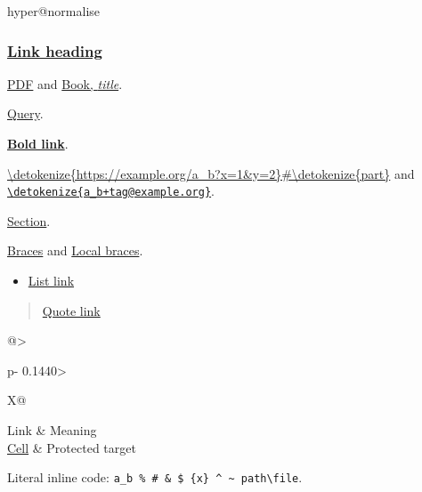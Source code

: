 \ifcsname hyper@normalise\endcsname\else\PackageError{mark2tex}{Markdown links require hyperref}{Load \string\usepackage{hyperref} in the document preamble.}\fi
\begin{frame}[t]
\frametitle{\href{\detokenize{https://example.org/heading}}{Link heading}}

\href{\detokenize{unterlagen/Auswahl der Inhalte.pdf}}{PDF} and \href{\detokenize{books/Book_name.pdf}}{Book, \emph{title}}.

\href{\detokenize{https://example.org/a}\%\detokenize{20b}\%\detokenize{20c?x=1&y=$@_}\#\detokenize{frag}}{Query}.

\textbf{\href{\detokenize{https://example.org/bold}\%\detokenize{20text?a=1&b=2}\#\detokenize{part}}{Bold link}}.

\url{\detokenize{https://example.org/a_b?x=1&y=2}\#\detokenize{part}} and \href{\detokenize{mailto:a_b+tag@example.org}}{\nolinkurl{\detokenize{a_b+tag@example.org}}}.

\hyperref[\detokenize{grundlagen}]{Section}.

\href{\detokenize{https://example.org/a}\Uchar123 \detokenize{b}\Uchar125 \Uchar94 \Uchar94 \detokenize{c}\Uchar92 \detokenize{d}}{Braces} and \href{\detokenize{unterlagen/a}\Uchar123 \detokenize{b}\Uchar125 \detokenize{.pdf}}{Local braces}.

\begin{itemize}
\item \href{\detokenize{https://example.org/list}}{List link}
\end{itemize}

\begin{quote}
\href{\detokenize{https://example.org/quote}}{Quote link}
\end{quote}

\par\addvspace{\medskipamount}
\noindent\begin{tabularx}{\linewidth}{@{}>{\raggedright\arraybackslash}p{}>{\raggedright\arraybackslash}X@{}}
\toprule
Link & Meaning \\
\midrule
\href{\detokenize{https://example.org/$@_}}{Cell} & Protected target \\
\bottomrule
\end{tabularx}
\par\addvspace{\medskipamount}

Literal inline code: \texttt{a\_b \% \# \& \$ \{x\} \textasciicircum{} \textasciitilde{} path\textbackslash{}file}.

\end{frame}

